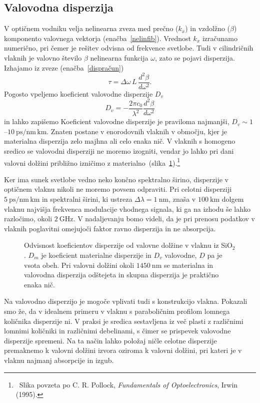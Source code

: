 \subsection*{Valovodna disperzija}
V optičnem vodniku velja nelinearna zveza med prečno ($k_x$) in vzdolžno ($\beta$)
komponento valovnega vektorja (enačba~\ref{nelinfib}). Vrednost $k_x$ izračunamo numerično, 
pri čemer je rešitev odvisna od frekvence svetlobe. Tudi v cilindričnih vlaknih je valovno število 
$\beta$ nelinearna funkcija $\omega$, zato se pojavi disperzija. Izhajamo iz zveze 
(enačba~\ref{dispračun})
\begin{equation}
\tau = \Delta \omega\, L\, \frac{d^2 \beta}{d \omega^2}.
\end{equation}
Pogosto vpeljemo koeficient valovodne disperzije $D_v$
\begin{equation}
D_v = -\frac{2\pi c_0}{\lambda^2}\frac{d^2 \beta}{d\omega^2}
\end{equation}
in lahko zapišemo
Koeficient valovodne disperzije je praviloma najmanjši, 
$D_v \sim 1$--$10~\si{\pico\second/\nano\meter\,\kilo\meter}$. 
Znaten postane v enorodovnih vlaknih v območju, kjer je materialna disperzija 
zelo majhna ali celo enaka nič. 
V vlaknih s homogeno sredico se valovodni disperziji ne moremo
izogniti, vendar jo lahko pri dani valovni dolžini približno izničimo 
z materialno~(slika~\ref{fig:MatVal}).\footnote{~Slika povzeta po C. R. Pollock, {\it 
Fundamentals of Optoelectronics}, Irwin (1995).}

Ker ima sunek svetlobe vedno neko končno spektralno širino, disperzije 
v optičnem vlaknu nikoli ne moremo povsem odpraviti. Pri celotni disperziji 
$5~\si{\pico\second/\nano\meter\,\kilo\meter}$ in spektralni širini, ki ustreza
$\Delta \lambda = 1~\si{\nano\meter}$, znaša v $100~\si{\kilo\meter}$ dolgem vlaknu najvišja 
frekvenca modulacije vhodnega signala, ki ga na izhodu še lahko razločimo, 
okoli $2~\si{\giga\hertz}$. V nadaljevanju bomo videli, da je pri prenosu podatkov
v vlaknih poglavitni omejujoči faktor ravno disperzija in ne absorpcija. 

\begin{figure}[ht]
\centering
\def\svgwidth{90truemm} 
 
\caption{Odvisnost koeficientov disperzije od valovne dolžine v vlaknu iz SiO$_2$. $D_m$ 
je koeficient materialne disperzije in $D_v$ valovodne, $D$ pa je vsota obeh. Pri valovni dolžini
okoli $1450~\si{\nano\meter}$ se materialna in valovodna disperzija odštejeta in skupna disperzija
je praktično enaka nič.}
\label{fig:MatVal}
\end{figure}
\begin{remark}
Na valovodno disperzijo je mogoče vplivati tudi s konstrukcijo vlakna. Pokazali smo že, da
v idealnem primeru v vlaknu s paraboličnim profilom lomnega količnika disperzije ni. 
V praksi je sredica sestavljena iz več plasti z različnimi lomnimi količniki in različnimi
debelinami, s čimer se prispevek valovodne disperzije spremeni. Na ta način lahko 
položaj ničle celotne disperzije premaknemo k valovni dolžini izvora oziroma k 
valovni dolžini, pri kateri je v vlaknu najmanj absorpcije in izgub.
\end{remark}

